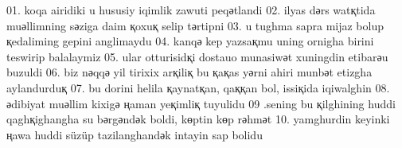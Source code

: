 01. koqa airidiki u hususiy iqimlik zawuti peqәtlandi
02. ilyas dәrs watқtida muәllimning sәziga daim қoxuқ selip tәrtipni 
03. u tughma sapra mijaz bolup қedaliming gepini anglimaydu  
04. kanqә kep yazsaқmu uning ornigha birini teswirip balalaymiz  
05. ular otturisidқi dostauo munasiwәt xuningdin etibarәu buzuldi  
06. biz nәqqә yil tirixix arқiliқ bu қaқas yәrni ahiri munbәt etizgha aylandurduқ                
07. bu dorini helila қaynatқan, qaққan bol, issiқida iqiwalghin
08. әdibiyat muәllim kixigә ңaman yeқimliқ tuyulidu
09 .sening bu қilghining huddi qaghқighangha su bәrgәndәk boldi, kөptin kөp rәhmәt
10. yamghurdin keyinki ңawa huddi süzüp tazilanghandәk intayin sap bolidu